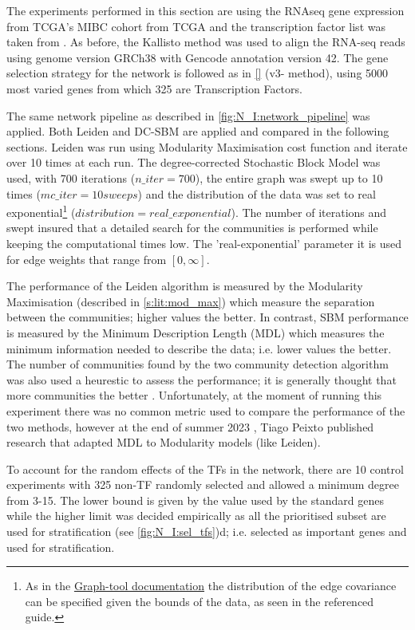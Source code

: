 The experiments performed in this section are using the RNAseq gene expression from TCGA's MIBC cohort from TCGA and the transcription factor list was taken from \citet{Lambert2018-el}. As before, the Kallisto method was used to align the RNA-seq reads using genome version GRCh38 with Gencode annotation version 42. The gene selection strategy for the network is followed as in \ref{} (v3- method), using 5000 most varied genes from which 325 are Transcription Factors.


The same network pipeline as described in \cref{fig:N_I:network_pipeline} was applied. Both Leiden and DC-SBM are applied and compared in the following sections. Leiden was run using Modularity Maximisation cost function and iterate over 10 times at each run. The degree-corrected Stochastic Block Model was used, with 700 iterations ($n\_iter=700$), the entire graph was swept up to 10 times ($mc\_iter = 10 sweeps$) and the distribution of the data was set to real exponential\footnote{As in the \href{https://graph-tool.skewed.de/static/doc/demos/inference/inference.html}{Graph-tool documentation} the distribution of the edge covariance can be specified given the bounds of the data, as seen in the referenced guide.} ($distribution = real\_exponential$). The number of iterations and swept insured that a detailed search for the communities is performed while keeping the computational times low. The 'real-exponential' parameter it is used for edge weights that range from $[0, \infty]$.

The performance of the Leiden algorithm is measured by the Modularity Maximisation (described in \cref{s:lit:mod_max}) which measure the separation between the communities; higher values the better. In contrast, SBM performance is measured by the Minimum Description Length (MDL) which measures the minimum information needed to describe the data; i.e. lower values the better. The number of communities found by the two community detection algorithm was also used a heurestic to assess the performance; it is generally thought that more communities the better \citet{Care2019-ij}. Unfortunately, at the moment of running this experiment there was no common metric used to compare the performance of the two methods, however at the end of summer 2023 \citet{Peixoto2023-mw}, Tiago Peixto published research that adapted MDL to Modularity models (like Leiden).

To account for the random effects of the TFs in the network, there are 10 control experiments with 325 non-TF randomly selected and allowed a minimum degree from 3-15. The lower bound is given by the value used by the standard genes while the higher limit was decided empirically as all the prioritised subset are used for stratification (see \cref{fig:N_I:sel_tfs})d; i.e. selected as important genes and used for stratification.


